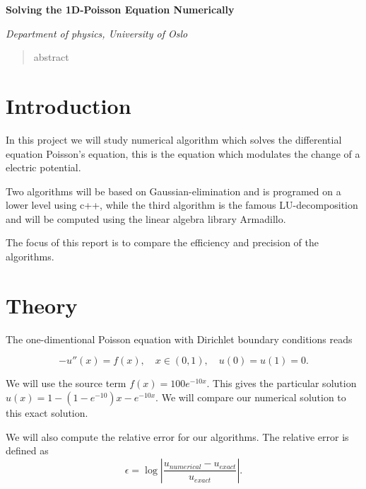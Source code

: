 \documentclass[10pt]{article}
\begin{document}
\begin{center}
  \large \textbf{Solving the 1D-Poisson Equation Numerically}

  
  \textit{Department of physics, University of Oslo}


\end{center}
\begin{abstract}
  abstract 


\end{abstract}
\section{Introduction}
In this project we will study numerical algorithm which solves the differential equation Poisson's equation, this is the equation which modulates the change of a electric potential. 

Two algorithms will be based on Gaussian-elimination and is programed on a lower level using c++, while the third algorithm is the famous LU-decomposition and will be computed using the linear algebra library Armadillo.

The focus of this report is to compare the efficiency and precision of the algorithms.

\section{Theory}
The one-dimentional Poisson equation 
with Dirichlet boundary conditions reads 

\begin{equation*}
 -u''(x)=f(x),\quad x\in (0,1),\quad u(0)=u(1)=0.
\end{equation*}

We will use the source term $f(x)=100e^{-10x}$. This gives the particular solution 
$u(x)=1-(1-e^{-10})x-e^{-10x}$. We will compare our numerical solution to this exact solution.

We will also compute the relative error for our algorithms. The relative error is defined as 
$$ \epsilon=\log{\left|\frac{u_{numerical}-u_{exact}}{u_{exact}}\right|}.$$
\end{document}

